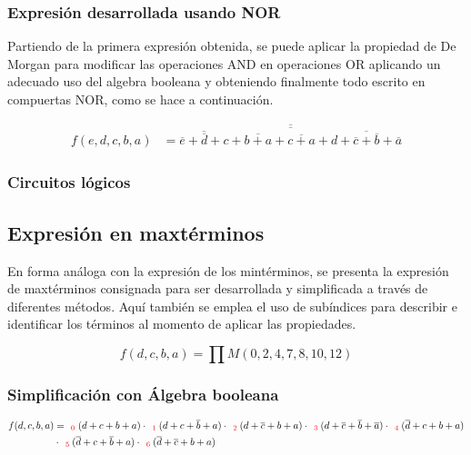 \subsubsection{Expresión desarrollada usando NOR}
Partiendo de la primera expresi\'on obtenida, se puede aplicar la propiedad de De Morgan para modificar las operaciones AND en operaciones OR
aplicando un adecuado uso del algebra booleana y obteniendo finalmente todo escrito en compuertas NOR,
como se hace a continuaci\'on.

\begin{align*}
f(e,d,c,b,a) & = \overline{
    \overline{
            \overline{\overline{e} + \overline{d} + c}
            + \overline{b + a}
            + \overline{c + a}
            + \overline{d + \overline{c} + \overline{b} + \overline{a}}
            }
    }
\end{align*}

\subsubsection{Circuitos lógicos}


\subsection{Expresi\'on en maxt\'erminos}
En forma an\'aloga con la expresi\'on de los mint\'erminos, se presenta la expresi\'on de maxt\'erminos consignada para ser
desarrollada y simplificada a trav\'es de diferentes m\'etodos. Aqu\'i tambi\'en se emplea el uso de sub\'indices para describir
e identificar los t\'erminos al momento de aplicar las propiedades.

\begin{equation*}
    f(d,c,b,a) = \prod M(0,2,4,7,8,10,12)
\end{equation*}

\subsubsection{Simplificación con Álgebra booleana}

\begin{align*}
f(d,c,b,a) & = _{\ \ \color{red} 0} {(d+c+b+a)}
\cdot _{\ \ \color{red} 1} {(d+c+\overline{b}+a)}
\cdot _{\ \ \color{red} 2} {(d+\overline{c}+b+a)}
\cdot _{\ \ \color{red} 3} {(d+\overline{c}+\overline{b}+\overline{a})}
\cdot _{\ \ \color{red} 4} {(\overline{d}+c+b+a)} \\
& \cdot _{\ \ \color{red} 5} {(\overline{d}+c+\overline{b}+a)}
\cdot _{\ \ \color{red} 6} {(\overline{d}+\overline{c}+b+a)}
\end{align*}

